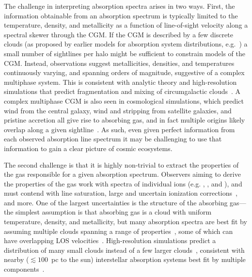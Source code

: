 \documentclass[fleqn,usenatbib]{mnras}
\begin{document}
The challenge in interpreting absorption spectra arises in two ways.
First, the information obtainable from an absorption spectrum is typically limited to the temperature, density, and metallicity as a function of line-of-sight velocity along a spectral skewer through the CGM.
If the CGM is described by a few discrete clouds (as proposed by earlier models for absorption system distributions, e.g.~\citealt{Srianand1994, Das2001, Maller2003}) a small number of sightlines per halo might be sufficient to constrain models of the CGM.
Instead, observations suggest metallicities, densities, and temperatures continuously varying, and spanning orders of magnitude, suggestive of a complex multiphase system.
This is consistent with analytic theory and high-resolution simulations that predict fragmentation and mixing of circumgalactic clouds~\citep[e.g.][]{Maller2004, mccourt2018Characteristic, hummels2019Impact, vandevoort2019Cosmological, peeples2019Figuring}.
A complex multiphase CGM is also seen in cosmological simulations, which predict wind from the central galaxy, wind and stripping from satellite galaxies, and pristine accretion all give rise to absorbing gas, and in fact multiple origins likely overlap along a given sightline~\citep[e.g.][]{Hafen2019, Hafen2020}.
As such, even given perfect information from each observed absorption line spectrum it may be challenging to use that information to gain a clear picture of cosmic ecosystems.

The second challenge is that it is highly non-trivial to extract the properties of the gas responsible for a given absorption spectrum.
Observers aiming to derive the properties of the gas work with spectra of individual ions (e.g. , , and ), and must contend with line saturation, large and uncertain ionization corrections~\citep[e.g.][]{Schaye2006, Acharya2021}, and more.
One of the largest uncertainties is the structure of the absorbing gas---the simplest assumption is that absorbing gas is a cloud with uniform temperature, density, and metallicity, but many absorption spectra are best fit by assuming multiple clouds spanning a range of properties~\citep[e.g.][]{Boksenberg1979, Muzahid2015, Liang2017, Liang2018, Haislmaier2021, sameer2021.cloudbycloud.bayesian.absorption.system.modeling, zahedy2021.CUBS.III.zle1.LLSs, marra2021.cosmo.sims.test.observational.modeling, narayanan2021.a.multiphase.pLLS, nielsen2022.a.multiphase.DLA}, some of which can have overlapping LOS velocities~\citep[e.g.][]{Marra2022}.
High-resolution simulations predict a distribution of many small clouds instead of a few larger clouds~\citep[e.g.][]{Fielding2020, Vijayan2021},
consistent with nearby ($\lesssim 100$~pc to the sun) interstellar absorption systems best fit by multiple components~\citep[e.g.][]{Welsh2010}.
\end{document}

